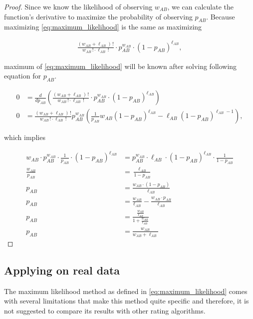 \begin{proof}
Since we know the likelihood of observing $w_{AB}$, we can calculate the function's derivative to maximize the probability of observing $p_{AB}$. Because maximizing \eqref{eq:maximum_likelihood} is the same as maximizing

\begin{align*}
\frac{({w_{AB} + \ell_{AB}})\,!}{w_{AB}\,!\cdot \ell_{AB}\,!}\cdot p_{AB}^{w_{AB}}\cdot {(1-p_{AB})}^{\ell_{AB}},
\end{align*}

\noindent maximum of \eqref{eq:maximum_likelihood} will be known after solving following equation for $p_{AB}$.

\begin{align*}
0 &= \frac{d}{dp_{AB}}\left(\frac{({w_{AB} + \ell_{AB}})\,!}{w_{AB}\,!\cdot \ell_{AB}\,!}\cdot p_{AB}^{w_{AB}}\cdot {(1-p_{AB})}^{\ell_{AB}}\right) \\[1em]
0 &= \frac{({w_{AB} + \ell_{AB}})\,!}{w_{AB}\,!\cdot\ell_{AB}\,!}p_{AB}^{w_{AB}}\left(\frac{1}{p_{AB}}w_{AB}(1-p_{AB})^{\ell_{AB}} - \ell_{AB}(1-p_{AB})^{\ell_{AB}-1}\right),
\end{align*}

\noindent which implies
\vspace{-1em}

\begin{align*}
w_{AB}\cdot p_{AB}^{w_{AB}}\cdot \frac{1}{p_{AB}}\cdot (1-p_{AB})^{\ell_{AB}} &= p_{AB}^{w_{AB}}\cdot \ell_{AB}\cdot (1-p_{AB})^{\ell_{AB}}\cdot \frac{1}{1-p_{AB}} \\[1em]
\frac{w_{AB}}{p_{AB}} &= \frac{\ell_{AB}}{1-p_{AB}} \\[1em]
p_{AB} &= \frac{w_{AB}\cdot (1-p_{AB})}{\ell_{AB}} \\[1em]
p_{AB} &= \frac{w_{AB}}{\ell_{AB}} - \frac{w_{AB}\cdot p_{AB}}{\ell_{AB}} \\[1em]
p_{AB} &= \frac{\frac{w_{AB}}{\ell_{AB}}}{1+\frac{w_{AB}}{\ell_{AB}}} \\[1em]
p_{AB} &= \frac{w_{AB}}{w_{AB} + \ell_{AB}}
\end{align*}
\end{proof}

\subsection{Applying on real data}
The maximum likelihood method as defined in \eqref{eq:maximum_likelihood} comes with several limitations that make this method quite specific and therefore, it is not suggested to compare its results with other rating algorithms.

